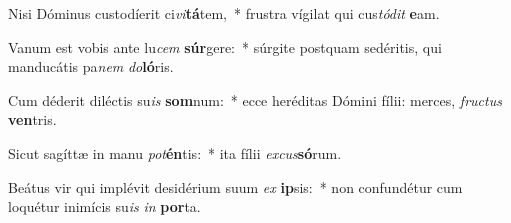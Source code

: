 \item Nisi Dóminus custodíerit ci\textit{vi}\textbf{tá}tem,~* frustra vígilat qui cus\textit{tó}\textit{dit} \textbf{e}am.
\item Vanum est vobis ante lu\textit{cem} \textbf{súr}gere:~* súrgite postquam sedéritis, qui manducátis pa\textit{nem} \textit{do}\textbf{ló}ris.
\item Cum déderit diléctis su\textit{is} \textbf{som}num:~* ecce heréditas Dómini fílii: merces, \textit{fruc}\textit{tus} \textbf{ven}tris.
\item Sicut sagíttæ in manu \textit{pot}\textbf{én}tis:~* ita fílii \textit{ex}\textit{cus}\textbf{só}rum.
\item Beátus vir qui implévit desidérium suum \textit{ex} \textbf{ip}sis:~* non confundétur cum loquétur inimícis su\textit{is} \textit{in} \textbf{por}ta.
